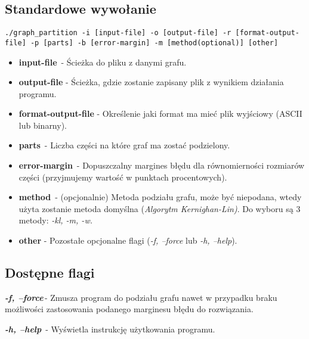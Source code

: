 \documentclass[a4paper,12pt]{article}
\begin{document}
\subsection{Standardowe wywołanie}
\begin{lstlisting}
./graph_partition -i [input-file] -o [output-file] -r [format-output-file] -p [parts] -b [error-margin] -m [method(optional)] [other]
\end{lstlisting}

\begin{itemize}

    \item \textbf{input-file}  - Ścieżka do pliku z danymi grafu. 

    \item \textbf{output-file } - Ścieżka, gdzie zostanie zapisany plik z wynikiem działania programu. 

    \item \textbf{format-output-file} - Określenie jaki format ma mieć plik wyjściowy (ASCII lub binarny). 

    \item \textbf{parts}  - Liczba części na które graf ma zostać podzielony. 

    \item \textbf{error-margin}  - Dopuszczalny margines błędu dla równomierności rozmiarów części (przyjmujemy wartość w punktach procentowych). 

    \item \textbf{method}  - (opcjonalnie) Metoda podziału grafu, może być niepodana, wtedy użyta zostanie metoda domyślna (\textit{Algorytm Kernighan-Lin)}. Do wyboru są 3 metody: \textit{-kl, -m, -w.} 

    \item \textbf{other }- Pozostałe opcjonalne flagi (\textit{-f, --force} lub \textit{-h, --help}). 

\end{itemize}

\subsection{Dostępne flagi }

\textit{\textbf{-f, --force}} - Zmusza program do podziału grafu nawet w przypadku braku możliwości zastosowania podanego marginesu błędu do rozwiązania. 

\textit{\textbf{-h, --help}}  - Wyświetla instrukcję użytkowania programu. 
\end{document}
